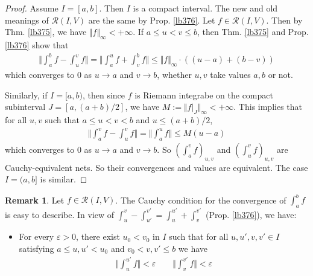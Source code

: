\documentclass[12pt,b5paper,notitlepage]{article}
\theoremstyle{definition}
\newtheorem{rem}[df]{Remark}
\theoremstyle{plain}
\newcommand{\scr}{\mathscr}
\newcommand{\eps}{\varepsilon}
\numberwithin{equation}{section}
\begin{document}
\begin{proof}
Assume $I=[a,b]$. Then $I$ is a compact interval. The new and old meanings of $\scr R(I,V)$ are the same by Prop. \ref{lb376}. Let $f\in\scr R(I,V)$. Then by Thm. \ref{lb375}, we have $\Vert f\Vert_\infty<+\infty$. If $a\leq u<v\leq b$, then Thm. \ref{lb375} and Prop. \ref{lb376} show that
\begin{align*}
\Big\Vert \int_a^bf-\int_u^vf \Big\Vert=\Big\Vert \int_a^uf+\int_v^bf \Big\Vert\leq \Vert f\Vert_\infty\cdot((u-a)+(b-v))
\end{align*}
which converges to $0$ as $u\rightarrow a$ and $v\rightarrow b$, whether $u,v$ take values $a,b$ or not. 

Similarly, if $I=[a,b)$, then since $f$ is Riemann integrabe on the compact subinterval $J=[a,(a+b)/2]$, we have $M:=\Vert f|_J\Vert_\infty<+\infty$. This implies that for all $u,v$ such that $a\leq u<v<b$ and $u\leq (a+b)/2$,
\begin{align*}
\Big\Vert \int_a^vf-\int_u^vf \Big\Vert=\Big\Vert \int_a^uf \Big\Vert\leq M(u-a)
\end{align*}
which converges to $0$ as $u\rightarrow a$ and $v\rightarrow b$. So $(\int_a^v f)_{u,v}$ and $(\int_u^vf)_{u,v}$ are Cauchy-equivalent nets. So their convergences and values are equivalent. The case $I=(a,b]$ is similar.
\end{proof}





\begin{rem}\label{lb418}
Let $f\in\scr R(I,V)$. The Cauchy condition for the convergence of $\int_a^bf$ is easy to describe. In view of $\int_u^v-\int_{u'}^{v'}=\int_u^{u'}+\int_v^{v'}$ (Prop. \ref{lb376}), we have:
\begin{itemize}
\item For every $\eps>0$, there exist $u_0<v_0$ in $I$ such that for all $u,u',v,v'\in I$ satisfying $a\leq u,u'<u_0$ and $v_0<v,v'\leq b$ we have
\begin{align*}
\Big\Vert\int_u^{u'}f\Big\Vert<\eps\qquad \Big\Vert \int_v^{v'}f\Big\Vert<\eps
\end{align*} 
\end{itemize}
\end{rem}
\end{document}
